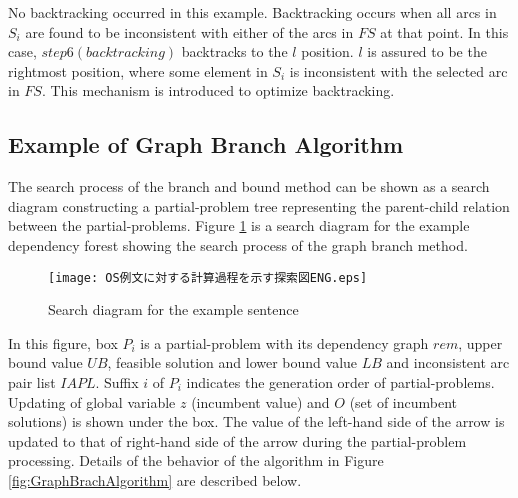 No backtracking occurred in this example. Backtracking occurs when all
arcs in $S_i$ are found to be inconsistent with either of the arcs in $FS$
at that point. In this case, $step6(backtracking)$ backtracks to the
$l$ position. $l$ is assured to be the rightmost position, where some
element in $S_i$ is inconsistent with the selected arc in $FS$. This
mechanism is introduced to optimize backtracking.


\subsection{Example of Graph Branch Algorithm}

The search process of the branch and bound method can be shown as a
search diagram constructing a partial-problem tree representing the
parent-child relation between the partial-problems. Figure
\ref{fig:SearchDiagramForExample} is a search diagram for the example
dependency forest showing the search process of the graph branch method.

\begin{figure}[bt]
 \begin{center}
     \texttt{[image: OS例文に対する計算過程を示す探索図ENG.eps]}
 \end{center}
\myfiglabelskippre
\caption{Search diagram for the example sentence}
\label{fig:SearchDiagramForExample}
\myfiglabelskippre
\end{figure}

In this figure, box $P_i$ is a partial-problem with its dependency
graph $rem$, upper bound value $UB$, feasible solution and lower bound
value $LB$ and inconsistent arc pair list $IAPL$. Suffix $i$ of $P_i$
indicates the generation order of partial-problems. Updating of global
variable $z$ (incumbent value) and $O$ (set of incumbent solutions) is
shown under the box. The value of the left-hand side of the arrow is
updated to that of right-hand side of the arrow during the
partial-problem processing. Details of the behavior of the algorithm
in Figure \ref{fig:GraphBrachAlgorithm} are described below.

